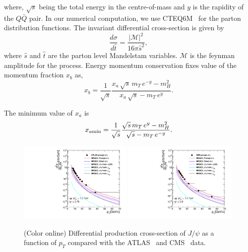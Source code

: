 \documentclass[aps,prc,preprint,superscriptaddress,showpacs,showkeys,amsmath]{revtex4-1}
\begin{document}
where, $\sqrt{s}$ being the total energy in the centre-of-mass and $y$ is the rapidity of 
the $Q\bar Q$ pair. In our numerical computation, we use CTEQ6M~\cite{Lai:2010vv} for the parton 
distribution functions. The invariant differential cross-section is given by
\begin{equation}
\frac{d\sigma}{d\hat t} = \frac{|\mathcal{M}|^2}{16\pi{\hat s}^2},
\end{equation}
where $\hat s$ and $\hat t$ are the parton level Mandelstam variables. $\mathcal{M}$ is the 
feynman amplitude for the process. Energy momentum conservation fixes value of the momentum 
fraction $x_b$ as,
\begin{equation}
x_b = \frac{1}{\sqrt{s}}\frac{x_a\,\sqrt{s}\,m_T\,e^{-y}-m^2_H}{x_a\,\sqrt{s}-m_T\,e^y}.
\end{equation}

The minimum value of $x_a$ is 
\begin{equation}
x_{a\rm min} = \frac{1}{\sqrt{s}}\frac{\sqrt{s}\,m_T\,e^{y}-m^2_H}{\sqrt{s}-m_T\,e^{-y}}.
\end{equation}

\begin{figure}
\includegraphics[width=0.49\textwidth]{Fig1b_JPsi_ATLAS_Y075_S7TeV.pdf}
\includegraphics[width=0.49\textwidth]{Fig1a_JPsi_CMS_Y090_S7TeV.pdf}
\caption{(Color online) Differential production cross-section of $J/\psi$ as a function of $p_{T}$ compared 
  with the ATLAS~\cite{Aad:2011sp} and CMS~\cite{Chatrchyan:2011kc} data.}
\label{fig:TauVsTemp}
\end{figure}
\end{document}
